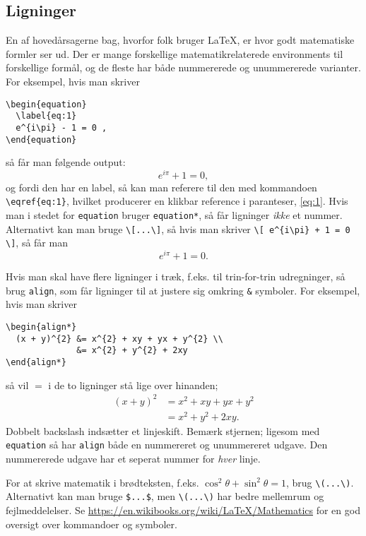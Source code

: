 \subsection{Ligninger}
\label{sec:equations}

En af hovedårsagerne bag, hvorfor folk bruger \LaTeX{}, er hvor godt matematiske formler ser ud.
Der er mange forskellige matematikrelaterede environments til forskellige formål, og de fleste har både nummererede og unummererede varianter.
For eksempel, hvis man skriver
%
\begin{verbatim}
\begin{equation}
  \label{eq:1}
  e^{i\pi} - 1 = 0 ,
\end{equation}
\end{verbatim}
%
så får man følgende output:
%
\begin{equation}
  \label{eq:1}
  e^{i\pi} + 1 = 0 ,
\end{equation}
%
og fordi den har en label, så kan man referere til den med kommandoen \verb!\eqref{eq:1}!, hvilket producerer en klikbar reference i paranteser, \eqref{eq:1}.
Hvis man i stedet for \texttt{equation} bruger \texttt{equation*}, så får ligninger \emph{ikke} et nummer.
Alternativt kan man bruge \verb!\[...\]!, så hvis man skriver \verb!\[ e^{i\pi} + 1 = 0 \]!, så får man
\[ e^{i\pi} + 1 = 0 .\]

Hvis man skal have flere ligninger i træk, f.eks. til trin-for-trin udregninger, så brug \texttt{align}, som får ligninger til at justere sig omkring \texttt{\&} symboler.
For eksempel, hvis man skriver
%
\begin{verbatim}
\begin{align*}
  (x + y)^{2} &= x^{2} + xy + yx + y^{2} \\
              &= x^{2} + y^{2} + 2xy
\end{align*}
\end{verbatim}
%
så vil \(=\) i de to ligninger stå lige over hinanden;
%
\begin{align*}
  (x + y)^{2} &= x^{2} + xy + yx + y^{2} \\
              &= x^{2} + y^{2} + 2xy .
\end{align*}
%
Dobbelt backslash indsætter et linjeskift.
Bemærk stjernen; ligesom med \texttt{equation} så har \texttt{align} både en nummereret og unummereret udgave.
Den nummererede udgave har et seperat nummer for \emph{hver} linje.

For at skrive matematik i brødteksten, f.eks. \(\cos^{2}\theta + \sin^{2}\theta = 1\), brug \verb!\(...\)!.
Alternativt kan man bruge \verb!$...$!, men \verb!\(...\)! har bedre mellemrum og fejlmeddelelser.
%
Se \url{https://en.wikibooks.org/wiki/LaTeX/Mathematics} for en god oversigt over kommandoer og symboler.


